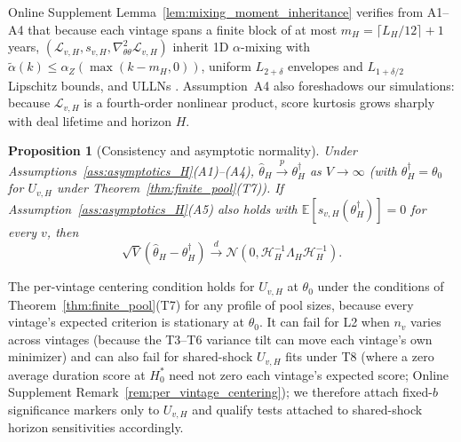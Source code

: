 \documentclass[12pt]{article}
\newtheorem{proposition}{Proposition}
\begin{document}
Online Supplement Lemma~\ref{lem:mixing_moment_inheritance} verifies from A1--A4 that because each vintage spans a finite block of at most $m_H = \lceil L_H/12 \rceil + 1$ years, $(\mathcal{L}_{v,H}, s_{v,H}, \nabla_{\theta\theta}^2 \mathcal{L}_{v,H})$ inherit 1D $\alpha$-mixing with $\tilde\alpha(k) \le \alpha_Z(\max(k - m_H, 0))$, uniform $L_{2+\delta}$ envelopes and $L_{1+\delta/2}$ Lipschitz bounds, and ULLNs \citep{Andrews92,Davidson94,PP97}.
Assumption~A4 also foreshadows our simulations: because $\mathcal{L}_{v,H}$ is a fourth-order nonlinear product, score kurtosis grows sharply with deal lifetime and horizon $H$.

\begin{proposition}[Consistency and asymptotic normality]
\label{prop:consistency_clt}
Under Assumptions~\ref{ass:asymptotics_H}(A1)--(A4), $\hat\theta_H \xrightarrow{p} \theta_H^\dagger$ as $V \to \infty$ (with $\theta_H^\dagger = \theta_0$ for $U_{v,H}$ under Theorem~\ref{thm:finite_pool}(T7)). If Assumption~\ref{ass:asymptotics_H}(A5) also holds with $\mathbb{E}[s_{v,H}(\theta_H^\dagger)] = 0$ for every $v$, then
\[
\sqrt{V}\left(\hat\theta_H - \theta_H^\dagger\right) \xrightarrow{d} \mathcal{N}\!\left(0, \mathcal{H}_H^{-1}\Lambda_H\mathcal{H}_H^{-1}\right).
\]
\end{proposition}

The per-vintage centering condition holds for $U_{v,H}$ at $\theta_0$ under the conditions of Theorem~\ref{thm:finite_pool}(T7) for any profile of pool sizes, because every vintage's expected criterion is stationary at $\theta_0$. It can fail for L2 when $n_v$ varies across vintages (because the T3--T6 variance tilt can move each vintage's own minimizer) and can also fail for shared-shock $U_{v,H}$ fits under T8 (where a zero average duration score at $H_0^\ast$ need not zero each vintage's expected score; Online Supplement Remark~\ref{rem:per_vintage_centering}); we therefore attach fixed-$b$ significance markers only to $U_{v,H}$ and qualify tests attached to shared-shock horizon sensitivities accordingly.
\end{document}
